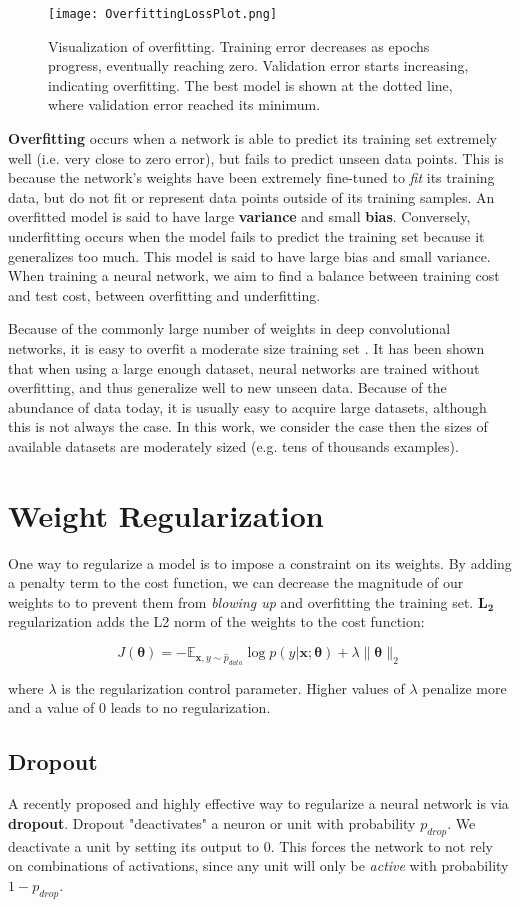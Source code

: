 \begin{figure}[h]
\caption{Visualization of overfitting. Training error decreases as epochs progress, eventually reaching zero.
Validation error starts increasing, indicating overfitting. The best model is shown at the dotted line, where
validation error reached its minimum.}
\centering
\texttt{[image: OverfittingLossPlot.png]}
\end{figure}

\textbf{Overfitting} occurs when a network is able to predict its training set extremely well (i.e. very close to zero error), but fails to predict
unseen data points. This is because the network's weights have been extremely fine-tuned to \textit{fit} its training data, but do not fit or represent
data points outside of its training samples.
An overfitted model is said to have large \textbf{variance} and small \textbf{bias}. Conversely, underfitting occurs when the model fails to predict
the training set because it generalizes too much. This model is said to have large bias and small variance. When training a neural network,
we aim to find a balance between training cost and test cost, between overfitting and underfitting.

Because of the commonly large number of weights in deep convolutional networks, it is easy to overfit a moderate size training set \cite{hinton2012improving}.
It has been shown that when using a large enough dataset, neural networks are trained without overfitting, and thus generalize well
to new unseen data. Because of the abundance of data today, it is usually easy to acquire large datasets, although this is not always the case.
In this work, we consider the case then the sizes of available datasets are moderately sized (e.g. tens of thousands examples).

\section{Weight Regularization}
One way to regularize a model is to impose a constraint on its weights. By adding a penalty term to the cost function, we can decrease the
magnitude of our weights to to prevent them from \textit{blowing up} and overfitting the training set. $\bm{L_2}$ regularization
adds the L2 norm of the weights to the cost function:

\[J(\bm{\theta}) = -\mathbb{E}_{\bm{x},y \sim \hat p_{data}} \log \textit{p}(y|\bm{x};\bm{\theta}) + \lambda \lVert \bm{\theta} \rVert_{2}\]

where $\lambda$ is the regularization control parameter. Higher values of $\lambda$ penalize more and a value of 0 leads to no regularization.

\subsection{Dropout}
A recently proposed and highly effective way to regularize a neural network is via \textbf{dropout}\cite{hinton2012improving}\cite{srivastava2014dropout}.
Dropout "deactivates" a neuron or unit with probability $p_{drop}$. We deactivate a unit
by setting its output to 0. This forces the network to not rely on combinations of
activations, since any unit will only be \textit{active} with probability $1-p_{drop}$.
